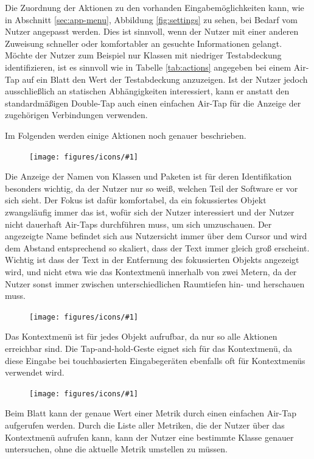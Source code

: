 Die Zuordnung der Aktionen zu den vorhanden Eingabemöglichkeiten kann, wie in Abschnitt \ref{sec:app-menu}, Abbildung \ref{fig:settings} zu sehen, bei Bedarf vom Nutzer angepasst werden. Dies ist sinnvoll, wenn der Nutzer mit einer anderen Zuweisung schneller oder komfortabler an gesuchte Informationen gelangt. Möchte der Nutzer zum Beispiel nur Klassen mit niedriger Testabdeckung identifizieren, ist es sinnvoll wie in Tabelle \ref{tab:actions} angegeben bei einem Air-Tap auf ein Blatt den Wert der Testabdeckung anzuzeigen. Ist der Nutzer jedoch ausschließlich an statischen Abhängigkeiten interessiert, kann er anstatt den standardmäßigen Double-Tap auch einen einfachen Air-Tap für die Anzeige der zugehörigen Verbindungen verwenden.

Im Folgenden werden einige Aktionen noch genauer beschrieben. \\

\newcommand{\inlineicon}[1]{
  \setlength\intextsep{0pt}
  \begin{figure}
    \vspace{-2px}
    \texttt{[image: figures/icons/\#1]}
  \end{figure}
}

\begingroup

\inlineicon{info}\noindent Die Anzeige der Namen von Klassen und Paketen ist für deren Identifikation besonders wichtig, da der Nutzer nur so weiß, welchen Teil der Software er vor sich sieht. Der Fokus ist dafür komfortabel, da ein fokussiertes Objekt zwangsläufig immer das ist, wofür sich der Nutzer interessiert und der Nutzer nicht dauerhaft Air-Taps durchführen muss, um sich umzuschauen. Der angezeigte Name befindet sich aus Nutzersicht immer über dem Cursor und wird dem Abstand entsprechend so skaliert, dass der Text immer gleich groß erscheint. Wichtig ist dass der Text in der Entfernung des fokussierten Objekts angezeigt wird, und nicht etwa wie das Kontextmenü innerhalb von zwei Metern, da der Nutzer sonst immer zwischen unterschiedlichen Raumtiefen hin- und herschauen muss.\\

\inlineicon{context-menu}\noindent Das Kontextmenü ist für jedes Objekt aufrufbar, da nur so alle Aktionen erreichbar sind. Die Tap-and-hold-Geste eignet sich für das Kontextmenü, da diese Eingabe bei touchbasierten Eingabegeräten ebenfalls oft für Kontextmenüs verwendet wird.\\

\inlineicon{metric}\noindent Beim Blatt kann der genaue Wert einer Metrik durch einen einfachen Air-Tap aufgerufen werden. Durch die Liste aller Metriken, die der Nutzer über das Kontextmenü aufrufen kann, kann der Nutzer eine bestimmte Klasse genauer untersuchen, ohne die aktuelle Metrik umstellen zu müssen.\\

